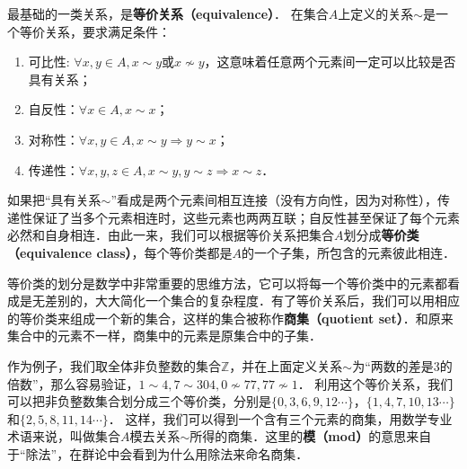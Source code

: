 最基础的一类关系，是\textbf{等价关系（equivalence）}． 在集合$A$上定义的关系$\sim$是一个等价关系，要求满足条件：
\begin{enumerate}
\item 可比性: $\forall x, y\in A, x\sim y \text{或} x\not\sim y$，这意味着任意两个元素间一定可以比较是否具有关系；
\item 自反性：$\forall x\in A, x\sim x$；
\item 对称性：$\forall x, y\in A, x\sim y \Rightarrow y\sim x$；
\item 传递性：$\forall x, y, z\in A, x\sim y, y\sim z\Rightarrow x\sim z$．
\end{enumerate}
如果把“具有关系$\sim$”看成是两个元素间相互连接（没有方向性，因为对称性），传递性保证了当多个元素相连时，这些元素也两两互联；自反性甚至保证了每个元素必然和自身相连．由此一来，我们可以根据等价关系把集合$A$划分成\textbf{等价类（equivalence class）}，每个等价类都是$A$的一个子集，所包含的元素彼此相连．

等价类的划分是数学中非常重要的思维方法，它可以将每一个等价类中的元素都看成是无差别的，大大简化一个集合的复杂程度．有了等价关系后，我们可以用相应的等价类来组成一个新的集合，这样的集合被称作\textbf{商集（quotient set）}．和原来集合中的元素不一样，商集中的元素是原集合中的子集．

作为例子，我们取全体非负整数的集合$\mathbb{Z}$，并在上面定义关系$\sim$为“两数的差是3的倍数”，那么容易验证，$1\sim4, 7\sim304, 0\not\sim 77, 77\not\sim 1$． 利用这个等价关系，我们可以把非负整数集合划分成三个等价类，分别是$\{0, 3, 6, 9, 12\cdots \}$，$\{1, 4, 7, 10, 13\cdots\}$和$\{2, 5, 8, 11, 14\cdots\}$． 这样，我们可以得到一个含有三个元素的商集，用数学专业术语来说，叫做集合$A$模去关系$\sim$所得的商集．这里的\textbf{模（mod）}的意思来自于“除法”，在群论中会看到为什么用除法来命名商集．
